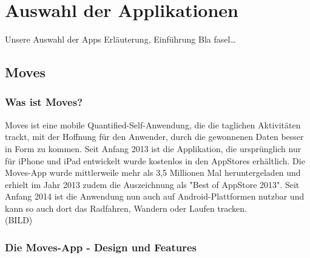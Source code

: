 
\chapter{Auswahl der Applikationen}
\label{ch:Apps}
Unsere Auswahl der Apps
Erläuterung, Einführung
Bla fasel\ldots



\section{Moves}
\label{ch:Apps:sec:Moves}

\subsection{Was ist Moves?}
\label{ch:Apps:sec:Moves:subsec:WIM}

Moves ist eine mobile Quantified-Self-Anwendung, die die taglichen Aktivitäten trackt, mit der Hoffnung für den Anwender, durch die gewonnenen Daten besser in Form zu kommen. 
Seit Anfang 2013 ist die Applikation, die ursprünglich nur für iPhone und iPad entwickelt wurde kostenlos in den AppStores erhältlich. 
Die Moves-App wurde mittlerweile mehr als 3,5 Millionen Mal heruntergeladen und erhielt im Jahr 2013 zudem die Auszeichnung als "Best of AppStore 2013".
Seit Anfang 2014 ist die Anwendung nun auch auf Android-Plattformen nutzbar und kann so auch dort das Radfahren, Wandern oder Laufen tracken.
\\
(BILD)

\subsection{Die Moves-App - Design und Features}
\label{ch:Apps:sec:Moves:subsec:DuF}

